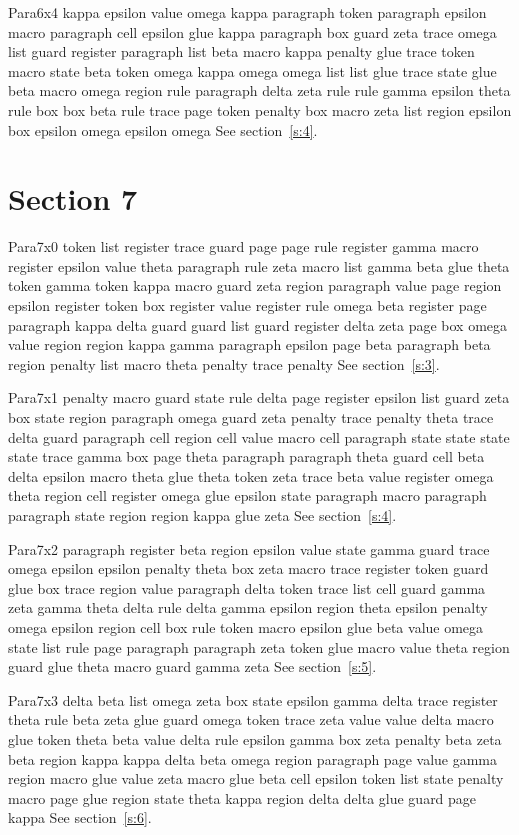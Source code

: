 \documentclass{article}
\begin{document}
Para6x4 kappa epsilon value omega kappa paragraph token paragraph epsilon macro paragraph cell epsilon glue kappa paragraph box guard zeta trace omega list guard register paragraph list beta macro kappa penalty glue trace token macro state beta token omega kappa omega omega list list glue trace state glue beta macro omega region rule paragraph delta zeta rule rule gamma epsilon theta rule box box beta rule trace page token penalty box macro zeta list region epsilon box epsilon omega epsilon omega See section~\ref{s:4}.

\section{Section 7}\label{s:7}
Para7x0 token list register trace guard page page rule register gamma macro register epsilon value theta paragraph rule zeta macro list gamma beta glue theta token gamma token kappa macro guard zeta region paragraph value page region epsilon register token box register value register rule omega beta register page paragraph kappa delta guard guard list guard register delta zeta page box omega value region region kappa gamma paragraph epsilon page beta paragraph beta region penalty list macro theta penalty trace penalty See section~\ref{s:3}.

Para7x1 penalty macro guard state rule delta page register epsilon list guard zeta box state region paragraph omega guard zeta penalty trace penalty theta trace delta guard paragraph cell region cell value macro cell paragraph state state state state trace gamma box page theta paragraph paragraph theta guard cell beta delta epsilon macro theta glue theta token zeta trace beta value register omega theta region cell register omega glue epsilon state paragraph macro paragraph paragraph state region region kappa glue zeta See section~\ref{s:4}.

Para7x2 paragraph register beta region epsilon value state gamma guard trace omega epsilon epsilon penalty theta box zeta macro trace register token guard glue box trace region value paragraph delta token trace list cell guard gamma zeta gamma theta delta rule delta gamma epsilon region theta epsilon penalty omega epsilon region cell box rule token macro epsilon glue beta value omega state list rule page paragraph paragraph zeta token glue macro value theta region guard glue theta macro guard gamma zeta See section~\ref{s:5}.

Para7x3 delta beta list omega zeta box state epsilon gamma delta trace register theta rule beta zeta glue guard omega token trace zeta value value delta macro glue token theta beta value delta rule epsilon gamma box zeta penalty beta zeta beta region kappa kappa delta beta omega region paragraph page value gamma region macro glue value zeta macro glue beta cell epsilon token list state penalty macro page glue region state theta kappa region delta delta glue guard page kappa See section~\ref{s:6}.
\end{document}
